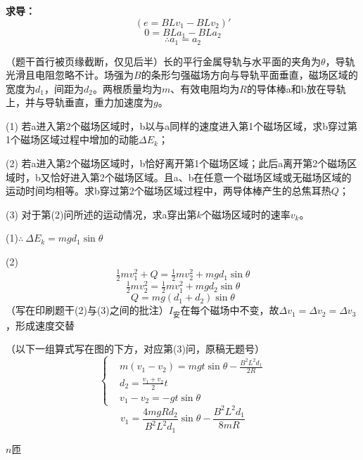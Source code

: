 \textbf{求导：}
\[ (e=BLv_1-BLv_2)' \]
\[ 0=BLa_1-BLa_2 \]
\[ \therefore a_1=a_2 \]
\begin{problem}
（题干首行被页缘截断，仅见后半）长的平行金属导轨与水平面的夹角为$\theta$，导轨光滑且电阻忽略不计。场强为$B$的条形匀强磁场方向与导轨平面垂直，磁场区域的宽度为$d_1$，间距为$d_2$。两根质量均为$m$、有效电阻均为$R$的导体棒a和b放在导轨上，并与导轨垂直，重力加速度为$g$。

(1) 若a进入第2个磁场区域时，b以与a同样的速度进入第1个磁场区域，求b穿过第1个磁场区域过程中增加的动能$\Delta E_k$；

(2) 若a进入第2个磁场区域时，b恰好离开第1个磁场区域；此后a离开第2个磁场区域时，b又恰好进入第2个磁场区域。且a、b在任意一个磁场区域或无磁场区域的运动时间均相等。求b穿过第2个磁场区域过程中，两导体棒产生的总焦耳热$Q$；

(3) 对于第(2)问所述的运动情况，求a穿出第$k$个磁场区域时的速率$v_k$。

\begin{solution}
(1)\quad $\therefore\ \Delta E_k=mgd_1\sin\theta$

(2)
\[ \tfrac12mv_1^2+Q=\tfrac12mv_2^2+mgd_1\sin\theta \]
\[ \tfrac12mv_2^2=\tfrac12mv_1^2+mgd_2\sin\theta \] %
\[ Q=mg(d_1+d_2)\sin\theta \]
（写在印刷题干(2)与(3)之间的批注）$I_{\text{安}}$在每个磁场中不变，故$\Delta v_1=\Delta v_2=\Delta v_3$，形成速度交替

（以下一组算式写在图的下方，对应第(3)问，原稿无题号）
\[
\left\{\begin{aligned}
&m(v_1-v_2)=mgt\sin\theta-\frac{B^2L^2d_1}{2R}\\
&d_2=\frac{v_1+v_2}{2}t\\
&v_1-v_2=-gt\sin\theta
\end{aligned}\right.
\]
\[ v_1=\frac{4mgRd_2}{B^2L^2d_1}\sin\theta-\frac{B^2L^2d_1}{8mR} \]
\end{solution}
\end{problem}
\quad $n$匝\ 

